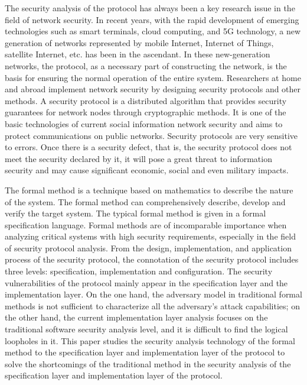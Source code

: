 \begin{eabstract}
The security analysis of the protocol has always been a key research issue in the field of network security. In recent years, with the rapid development of emerging technologies such as smart terminals, cloud computing, and 5G technology, a new generation of networks represented by mobile Internet, Internet of Things, satellite Internet, etc. has been in the ascendant. In these new-generation networks, the protocol, as a necessary part of constructing the network, is the basis for ensuring the normal operation of the entire system. Researchers at home and abroad implement network security by designing security protocols and other methods. A security protocol is a distributed algorithm that provides security guarantees for network nodes through cryptographic methods. It is one of the basic technologies of current social information network security and aims to protect communications on public networks. Security protocols are very sensitive to errors. Once there is a security defect, that is, the security protocol does not meet the security declared by it, it will pose a great threat to information security and may cause significant economic, social and even military impacts.

The formal method is a technique based on mathematics to describe the nature of the system. The formal method can comprehensively describe, develop and verify the target system. The typical formal method is given in a formal specification language. Formal methods are of incomparable importance when analyzing critical systems with high security requirements, especially in the field of security protocol analysis. From the design, implementation, and application process of the security protocol, the connotation of the security protocol includes three levels: specification, implementation and configuration. The security vulnerabilities of the protocol mainly appear in the specification layer and the implementation layer. On the one hand, the adversary model in traditional formal methods is not sufficient to characterize all the adversary's attack capabilities; on the other hand, the current implementation layer analysis focuses on the traditional software security analysis level, and it is difficult to find the logical loopholes in it. This paper studies the security analysis technology of the formal method to the specification layer and implementation layer of the protocol to solve the shortcomings of the traditional method in the security analysis of the specification layer and implementation layer of the protocol.


\end{eabstract}
